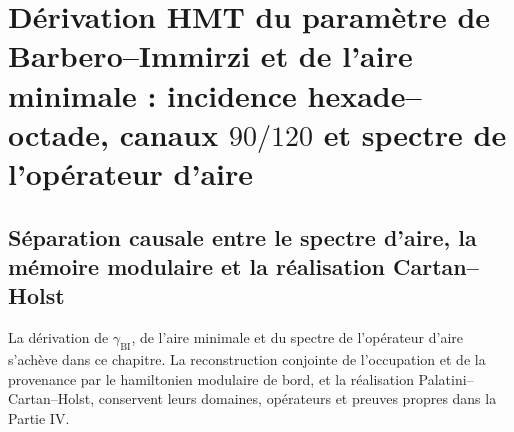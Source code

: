 \chapter{Dérivation HMT du paramètre de Barbero--Immirzi et de l’aire minimale : incidence hexade--octade, canaux \(90/120\) et spectre de l’opérateur d’aire}
\label{chap:p3-final:51:barbero_area}






\section{Séparation causale entre le spectre d’aire, la mémoire modulaire et la réalisation Cartan--Holst}
La dérivation de $\gamma_{\mathrm{BI}}$, de l’aire minimale et du spectre de l’opérateur d’aire s’achève dans ce chapitre. La reconstruction conjointe de l’occupation et de la provenance par le hamiltonien modulaire de bord, et la réalisation Palatini--Cartan--Holst, conservent leurs domaines, opérateurs et preuves propres dans la Partie IV.
